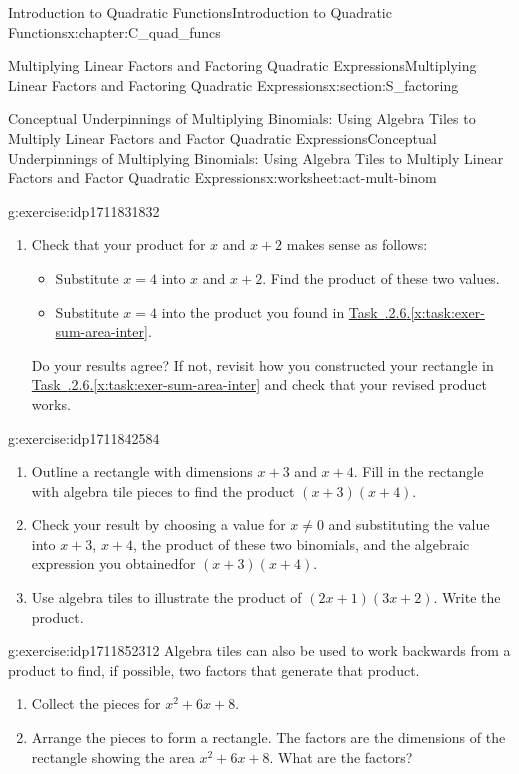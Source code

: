 \documentclass[oneside,10pt,]{book}
\newcommand{\xreffont}{\relax}
\numberwithin{equation}{chapter}
\begin{document}
\begin{chapterptx}{Introduction to Quadratic Functions}{}{Introduction to Quadratic Functions}{}{}{x:chapter:C_quad_funcs}
\begin{sectionptx}{Multiplying Linear Factors and Factoring Quadratic Expressions}{}{Multiplying Linear Factors and Factoring Quadratic Expressions}{}{}{x:section:S_factoring}
\begin{worksheet-subsection}{Conceptual Underpinnings of Multiplying Binomials: Using Algebra Tiles to Multiply Linear Factors and Factor Quadratic Expressions}{}{Conceptual Underpinnings of Multiplying Binomials: Using Algebra Tiles to Multiply Linear Factors and Factor Quadratic Expressions}{}{}{x:worksheet:act-mult-binom}
\begin{divisionexercise}{6}{}{}{g:exercise:idp1711831832}
\begin{enumerate}[font=\bfseries,label=(\alph*),ref=\alph*]
\item{}Check that your product for \(x\) and \(x + 2\) makes sense as follows:%
\begin{itemize}[label=\textbullet]
\item{}Substitute \(x = 4\) into \(x\) and \(x + 2\). Find the product of these two values.%
\item{}Substitute \(x = 4\) into the product you found in \hyperref[x:task:exer-sum-area-inter]{Task~{\xreffont 4.3.2.6}.{\xreffont\ref{x:task:exer-sum-area-inter}}}.%
\end{itemize}
Do your results agree? If not, revisit how you constructed your rectangle in \hyperref[x:task:exer-sum-area-inter]{Task~{\xreffont 4.3.2.6}.{\xreffont\ref{x:task:exer-sum-area-inter}}} and check that your revised product works.%
\end{enumerate}
\end{divisionexercise}%
\begin{divisionexercise}{7}{}{}{g:exercise:idp1711842584}%
\begin{enumerate}[font=\bfseries,label=(\alph*),ref=\alph*]
\item{}Outline a rectangle with dimensions \(x + 3\) and \(x + 4\). Fill in the rectangle with algebra tile pieces to find the product \((x + 3)(x + 4)\).%
\item{}Check your result by choosing a value for \(x \ne 0\) and substituting the value into \(x + 3\), \(x + 4\), the product of these two binomials, and the algebraic expression you obtainedfor \((x + 3)(x + 4)\).%
\item{}Use algebra tiles to illustrate the product of \((2x + 1)(3x + 2)\). Write the product.%
\end{enumerate}
\end{divisionexercise}%
\begin{divisionexercise}{8}{}{}{g:exercise:idp1711852312}%
Algebra tiles can also be used to work backwards from a product to find, if possible, two factors that generate that product.%
\begin{enumerate}[font=\bfseries,label=(\alph*),ref=\alph*]
\item{}Collect the pieces for \(x^2 + 6x + 8\).%
\item\label{x:task:exer-arrange-quad}Arrange the pieces to form a rectangle. The factors are the dimensions of the rectangle showing the area \(x^2 + 6x + 8\). What are the factors?%

\end{enumerate}
\end{divisionexercise}
\end{worksheet-subsection}
\end{sectionptx}
\end{chapterptx}
\end{document}
